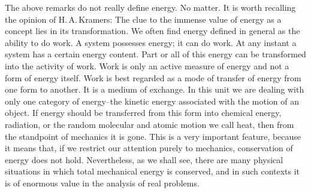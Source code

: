 {{The above remarks do not really define energy.
No matter.
It is worth recalling the opinion of H.\,A.\,Kramers:
The clue to the immense value of energy as a concept lies in its
transformation.
We often find energy defined in general as the ability to do work.
A system possesses energy; it can do work.
At any instant a system has a certain energy content.
Part or all of this energy can be transformed into the activity of work.
Work is only an active measure of energy and not a form of energy itself.
Work is best regarded as a mode of transfer of energy from one form to
another.
It is a medium of exchange.
In this unit we are dealing with only one category of energy--the kinetic
energy associated with the motion of an object.
If energy should be transferred from this form into chemical energy,
radiation, or the random molecular and atomic motion we call heat, then from
the standpoint of mechanics it is gone.
This is a very important feature, because it means that, if we restrict our
attention purely to mechanics, conservation of energy does not hold.
Nevertheless, as we shall see, there are many physical situations in which
total mechanical energy is conserved, and in such contexts it is of
enormous value in the analysis of real problems.
}%
%
}

